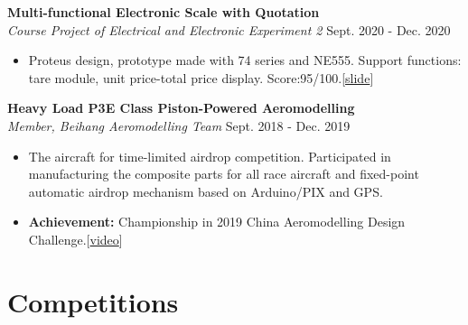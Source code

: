 \documentclass[11pt, a4paper]{article}
\begin{document}
\begin{researchitem}
    \item \textbf{Multi-functional Electronic Scale with Quotation}  \\
    \textit{Course Project of Electrical and Electronic Experiment 2} \hfill Sept. 2020 - Dec. 2020
    \begin{itemize}[noitemsep, topsep=0pt]
        \item Proteus design, prototype made with 74 series and NE555. Support functions: tare module, unit price-total price display. Score:95/100.[\href{https://zcen-xiong.github.io/research/scale.pdf}{slide}]
    \end{itemize}
\end{researchitem}
\begin{researchitem}
    \item \textbf{Heavy Load P3E Class Piston-Powered Aeromodelling}  \\
    \textit{Member, Beihang Aeromodelling Team} \hfill Sept. 2018 - Dec. 2019
    \begin{itemize}[noitemsep, topsep=0pt]
        \item The aircraft for time-limited airdrop competition. Participated in manufacturing  the composite parts for all race aircraft and fixed-point automatic airdrop mechanism based on Arduino/PIX and GPS.
        \item \textbf{Achievement:} Championship in 2019 China Aeromodelling Design Challenge.[\href{https://www.bilibili.com/video/BV1jV411B7Ga/}{video}]
    
    \end{itemize}
\end{researchitem}

\section*{Competitions}
\end{document}
